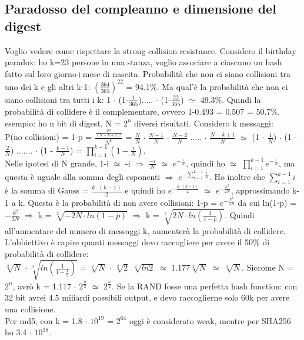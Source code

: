 \documentclass[16px]{article}
\begin{document}
\begin{enumerate}
\subsection{Paradosso del compleanno e dimensione del digest}
Voglio vedere come rispettare la strong collision resistance. Considero il birthday paradox: ho k=23 persone in una stanza, voglio associare a ciascuno un hash fatto sul loro giorno+mese di nascita. Probabilità che non ci siano collisioni tra uno dei k e gli altri k-1: $(\frac{364}{365})^{22}$ = 94.1\%. Ma qual'è la probabilità che non ci siano collisioni tra tutti i k: 1 $\cdot$ (1-$\frac{1}{365}$)..... $\cdot$ (1-$\frac{22}{365}$) $\simeq$ 49.3\%. Quindi la probabilità di collidere è il complementare, ovvero 1-0.493 = 0.507 = 50.7\%. esempio: ho n bit di digest, N = $2^n$ diversi risultati. Considero k messaggi:\\ P(no collisioni) = 1-p = $\frac{\frac{N!}{(N-k+1)!}}{N^k}$ = $\frac{N}{N}$ $\cdot$ $\frac{N-1}{N}$ $\cdot$ $\frac{N-2}{N}$ ..... $\cdot$ $\frac{N-k+1}{N}$ $\simeq$ (1 - $\frac{1}{N}$) $\cdot$ (1 - $\frac{2}{N}$) ....... $\cdot$ (1 - $\frac{k-1}{N}$) = $\prod\limits_{i=1}^{k-1}(1 - \frac{i}{N})$.\\ Nelle ipotesi di N grande, 1-i $\simeq$ -i $\Rightarrow$ $\frac{-i}{N}$ $\simeq$ $e^{-\frac{i}{N}}$, quindi ho $\simeq$ $\prod\limits_{i=1}^{k-1}e^{-\frac{i}{N}}$, ma questa è uguale alla somma degli esponenti $\Rightarrow$ $e^{-\sum\limits_{i=1}^{k-1}\frac{i}{N}}$. Ho inoltre che $\sum\limits_{i=1}^{k-1} i$ è la somma di Gauss = $\frac{k \cdot (k-1)}{2}$ e quindi ho $e^{-\frac{k \cdot (k-1)}{2}}$ $\simeq$ $e^{-\frac{k^2}{2N}}$, approssimando k-1 a k. Questa è la probabilità di non avere collisioni: 1-p = $e^{-\frac{k^2}{2N}}$ da cui ln(1-p) = $-\frac{k^2}{2N}$ $\Rightarrow$ k = $\sqrt[2]{-2N \cdot ln(1-p)}$ $\Rightarrow$ k = $\sqrt[2]{2N \cdot ln(\frac{1}{1-p})}$. Quindi all'aumentare del numero di messaggi k, aumenterà la probabilità di collidere. L'obbiettivo è capire quanti messaggi devo raccogliere per avere il 50\% di probabilità di collidere:\\
$\sqrt[2]{N}$ $\cdot$ $\sqrt[2]{ln(\frac{1}{1-\frac{1}{2}})}$ = $\sqrt[2]{N}$ $\cdot$ $\sqrt[2]{2}$ $\sqrt[2]{ln2}$ $\simeq$ 1.177$\sqrt[2]{N}$ $\simeq$ $\sqrt[2]{N}$. Siccome N = $2^n$, avrò k = 1.117 $\cdot$ $2^{\frac{n}{2}}$ $\simeq$ $2^{\frac{n}{2}}$. Se la RAND fosse una perfetta hash function: con 32 bit avrei 4.5 miliardi possibili output, e devo raccoglierne solo 60k per avere una collisione.\\ Per md5, con k = 1.8 $\cdot$ $10^{19}$ = $2^64$ oggi è considerato weak, mentre per SHA256 ho 3.4 $\cdot$ $10^{38}$.
\end{enumerate}
\end{document}
